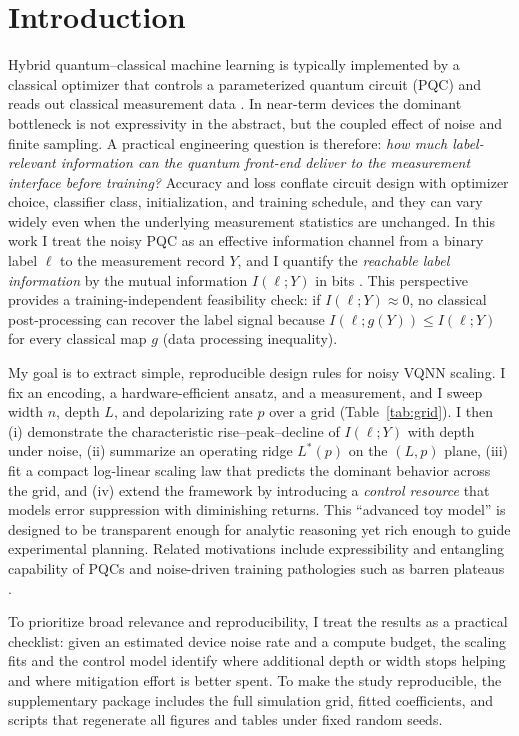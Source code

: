 \documentclass[journal]{IEEEtran}
\newcommand{\MI}{I(\ell;Y)}
\begin{document}
\section{Introduction}
Hybrid quantum--classical machine learning is typically implemented by a classical optimizer that controls a parameterized quantum circuit (PQC) and reads out classical measurement data \cite{ref15,ref16}. In near-term devices the dominant bottleneck is not expressivity in the abstract, but the coupled effect of noise and finite sampling. A practical engineering question is therefore: \emph{how much label-relevant information can the quantum front-end deliver to the measurement interface before training?} Accuracy and loss conflate circuit design with optimizer choice, classifier class, initialization, and training schedule, and they can vary widely even when the underlying measurement statistics are unchanged. In this work I treat the noisy PQC as an effective information channel from a binary label $\ell$ to the measurement record $Y$, and I quantify the \emph{reachable label information} by the mutual information $\MI$ in bits \cite{ref3}. This perspective provides a training-independent feasibility check: if $\MI\approx 0$, no classical post-processing can recover the label signal because $I(\ell;g(Y))\le \MI$ for every classical map $g$ (data processing inequality). 

My goal is to extract simple, reproducible design rules for noisy VQNN scaling. I fix an encoding, a hardware-efficient ansatz, and a measurement, and I sweep width $n$, depth $L$, and depolarizing rate $p$ over a grid (Table~\ref{tab:grid}). I then (i) demonstrate the characteristic rise--peak--decline of $\MI$ with depth under noise, (ii) summarize an operating ridge $L^{\ast}(p)$ on the $(L,p)$ plane, (iii) fit a compact log-linear scaling law that predicts the dominant behavior across the grid, and (iv) extend the framework by introducing a \emph{control resource} that models error suppression with diminishing returns. This ``advanced toy model'' is designed to be transparent enough for analytic reasoning yet rich enough to guide experimental planning. Related motivations include expressibility and entangling capability of PQCs \cite{ref7} and noise-driven training pathologies such as barren plateaus \cite{ref4,ref5,ref6}.

To prioritize broad relevance and reproducibility, I treat the results as a practical checklist: given an estimated device noise rate and a compute budget, the scaling fits and the control model identify where additional depth or width stops helping and where mitigation effort is better spent. To make the study reproducible, the supplementary package includes the full simulation grid, fitted coefficients, and scripts that regenerate all figures and tables under fixed random seeds.
\end{document}
